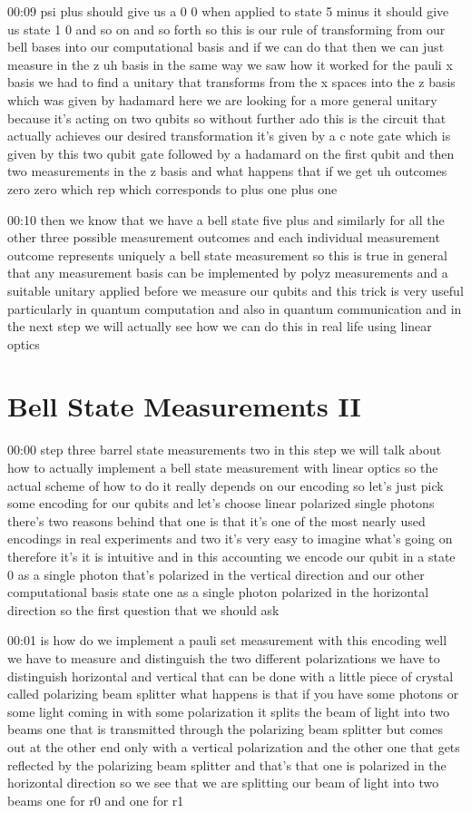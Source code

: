 00:09
psi plus should give us a 0 0 when applied to state 5 minus it should give
us state 1 0 and so on and so forth so this is our rule of transforming from our
bell bases into our computational basis and if we can do that then we can just
measure in the z uh basis in the same way we saw how it
worked for the pauli x basis we had to find a unitary that transforms from the
x spaces into the z basis which was given by hadamard
here we are looking for a more general unitary because it's acting on two qubits
so without further ado this is the circuit that actually achieves
our desired transformation it's given by a c note gate
which is given by this two qubit gate followed by a hadamard on the first qubit
and then two measurements in the z basis and what happens that if we get uh
outcomes zero zero which rep which corresponds to plus one plus one

00:10
then we know that we have a bell state five plus and similarly for all the
other three possible measurement outcomes and each individual
measurement outcome represents uniquely a bell state measurement
so this is true in general that any measurement
basis can be implemented by polyz measurements and a suitable unitary
applied before we measure our qubits and this trick is very useful
particularly in quantum computation and also in quantum communication and in
the next step we will actually see how we can do this in real life using
linear optics

\section{Bell State Measurements II}

00:00
step three barrel state measurements two in this step we will talk about how to
actually implement a bell state measurement with linear optics
so the actual scheme of how to do it really depends on our encoding
so let's just pick some encoding for our
qubits and let's choose linear polarized single photons
there's two reasons behind that one is that it's one of the most nearly used
encodings in real experiments and two it's very easy to imagine what's
going on therefore it's it is intuitive and in this accounting we encode our
qubit in a state 0 as a single photon that's polarized in the vertical direction
and our other computational basis state one as a single photon polarized in the
horizontal direction so the first question that we should ask

00:01
is how do we implement a pauli set measurement with this encoding
well we have to measure and distinguish the two different
polarizations we have to distinguish horizontal and vertical that can be done
with a little piece of crystal called polarizing beam splitter what happens
is that if you have some photons or some light coming in
with some polarization it splits the beam of light into two beams
one that is transmitted through the polarizing beam splitter
but comes out at the other end only with a vertical polarization and the
other one that gets reflected by the polarizing beam splitter
and that's that one is polarized in the horizontal direction
so we see that we are splitting our beam of light
into two beams one for r0 and one for r1

